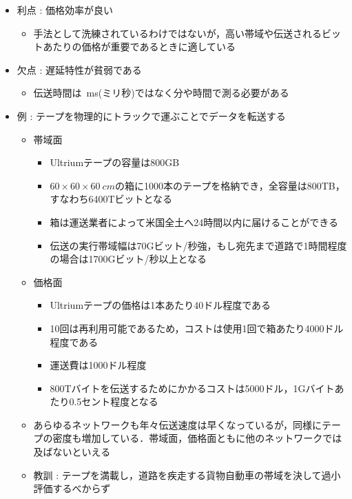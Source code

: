\documentclass[a4paper]{ltjsarticle}
\begin{document}
			\begin{itemize}
				\item 利点 : 価格効率が良い
				\begin{itemize}
					\item 手法として洗練されているわけではないが，高い帯域や伝送されるビットあたりの価格が重要であるときに適している
				\end{itemize}
				\item 欠点 : 遅延特性が貧弱である
				\begin{itemize}
					\item 伝送時間は\SI{}{ms}(ミリ秒)ではなく分や時間で測る必要がある
				\end{itemize}
				\item 例 : テープを物理的にトラックで運ぶことでデータを転送する
				\begin{itemize}
					\item 帯域面
					\begin{itemize}
						\item Ultriumテープの容量は800GB
						\item $60 \times 60 \times \SI{60}{cm}$の箱に1000本のテープを格納でき，全容量は800TB，すなわち6400Tビットとなる
						\item 箱は運送業者によって米国全土へ24時間以内に届けることができる
						\item 伝送の実行帯域幅は70Gビット/秒強，もし宛先まで道路で1時間程度の場合は1700Gビット/秒以上となる
					\end{itemize}
					\item 価格面
					\begin{itemize}
						\item Ultriumテープの価格は1本あたり40ドル程度である
						\item 10回は再利用可能であるため，コストは使用1回で箱あたり4000ドル程度である
						\item 運送費は1000ドル程度
						\item 800Tバイトを伝送するためにかかるコストは5000ドル，1Gバイトあたり0.5セント程度となる
					\end{itemize}
					\item あらゆるネットワークも年々伝送速度は早くなっているが，同様にテープの密度も増加している．帯域面，価格面ともに他のネットワークでは及ばないといえる
					\item 教訓 : テープを満載し，道路を疾走する貨物自動車の帯域を決して過小評価するべからず
				\end{itemize}
			\end{itemize}
\end{document}

